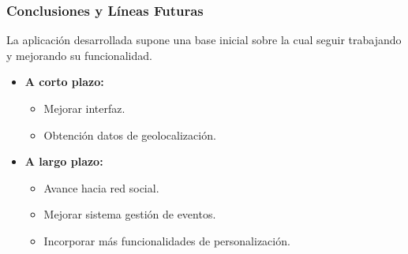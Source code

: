 \documentclass[usenames,dvipsnames]{beamer}
\begin{document}
\begin{frame}
\frametitle{Conclusiones y Líneas Futuras}
La aplicación desarrollada supone una base inicial sobre la cual seguir trabajando y mejorando su funcionalidad.
\vspace{0.5cm}
\begin{itemize}

	\item \textbf{A corto plazo:}
		\begin{itemize}
			\item Mejorar interfaz.
			\item Obtención datos de geolocalización.
		\end{itemize}
	\vspace{0.5cm}
	\item \textbf{A largo plazo:}
		\begin{itemize}
			\item Avance hacia red social.
			\item Mejorar sistema gestión de eventos.
			\item Incorporar más funcionalidades de personalización.
		\end{itemize}
\end{itemize}
\end{frame}
 
 

\begin{frame}
\centering
{}
\maketitle


\end{frame}
                
                  
\end{document}
